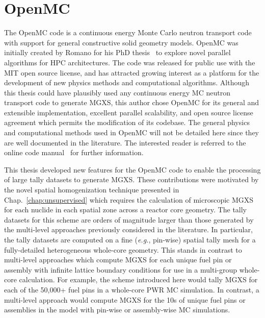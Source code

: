\section{OpenMC}
\label{sec:chap3-openmc}

The OpenMC code is a continuous energy Monte Carlo neutron transport code~\cite{romano2013openmc} with support for general constructive solid geometry models. OpenMC was initially created by Romano for his PhD thesis~\cite{romano2013parallel} to explore novel parallel algorithms for \ac{HPC} architectures. The code was released for public use with the MIT open source license, and has attracted growing interest as a platform for the development of new physics methods and computational algorithms. Although this thesis could have plausibly used any continuous energy \ac{MC} neutron transport code to generate \ac{MGXS}, this author chose OpenMC for its general and extensible implementation, excellent parallel scalability, and open source license agreement which permits the modification of its codebase. The general physics and computational methods used in OpenMC will not be detailed here since they are well documented in the literature. The interested reader is referred to the online code manual~\cite{openmc2016manual} for further information.

This thesis developed new features for the OpenMC code to enable the processing of large tally datasets to generate \ac{MGXS}. These contributions were motivated by the novel spatial homogenization technique presented in Chap.~\ref{chap:unsupervised} which requires the calculation of microscopic \ac{MGXS} for each nuclide in each spatial zone across a reactor core geometry. The tally datasets for this scheme are orders of magnitude larger than those generated by the multi-level approaches previously considered in the literature. In particular, the tally datasets are computed on a fine (\textit{e.g.}, pin-wise) spatial tally mesh for a fully-detailed heterogeneous whole-core geometry. This stands in contrast to multi-level approaches which compute \ac{MGXS} for each unique fuel pin or assembly with infinite lattice boundary conditions for use in a multi-group whole-core calculation. For example, the scheme introduced here would tally \ac{MGXS} for each of the 50,000+ fuel pins in a whole-core \ac{PWR} \ac{MC} simulation. In contrast, a multi-level approach would compute \ac{MGXS} for the 10s of unique fuel pins or assemblies in the model with pin-wise or assembly-wise \ac{MC} simulations.

